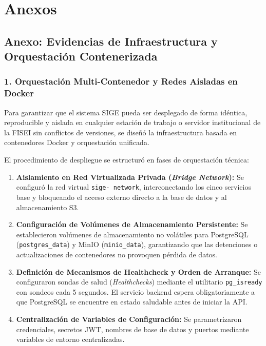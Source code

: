 \documentclass[12pt,a4paper]{article}
\begin{document}
\vspace{0.4cm}

\section{Anexos}

\subsection*{Anexo: Evidencias de Infraestructura y Orquestación Contenerizada}

\subsubsection*{1. Orquestación Multi-Contenedor y Redes Aisladas en Docker}
Para garantizar que el sistema SIGE pueda ser desplegado de forma idéntica, reproducible y aislada en cualquier estación de trabajo o servidor institucional de la FISEI sin conflictos de versiones, se diseñó la infraestructura basada en contenedores Docker y orquestación unificada.

El procedimiento de despliegue se estructuró en fases de orquestación técnica:
\begin{enumerate}[leftmargin=1.5em, itemsep=2pt]
    \item \textbf{Aislamiento en Red Virtualizada Privada (\textit{Bridge Network}):} Se configuró la red virtual \texttt{sige- network}, interconectando los cinco servicios base y bloqueando el acceso externo directo a la base de datos y al almacenamiento S3.
    \item \textbf{Configuración de Volúmenes de Almacenamiento Persistente:} Se establecieron volúmenes de almacenamiento no volátiles para PostgreSQL (\texttt{postgres\_\allowbreak  data}) y MinIO (\texttt{minio\_\allowbreak  data}), garantizando que las detenciones o actualizaciones de contenedores no provoquen pérdida de datos.
    \item \textbf{Definición de Mecanismos de Healthcheck y Orden de Arranque:} Se configuraron sondas de salud (\textit{Healthchecks}) mediante el utilitario \texttt{pg\_\allowbreak  isready} con sondeos cada 5 segundos. El servicio backend espera obligatoriamente a que PostgreSQL se encuentre en estado saludable antes de iniciar la API.
    \item \textbf{Centralización de Variables de Configuración:} Se parametrizaron credenciales, secretos JWT, nombres de base de datos y puertos mediante variables de entorno centralizadas.
\end{enumerate}
\end{document}
